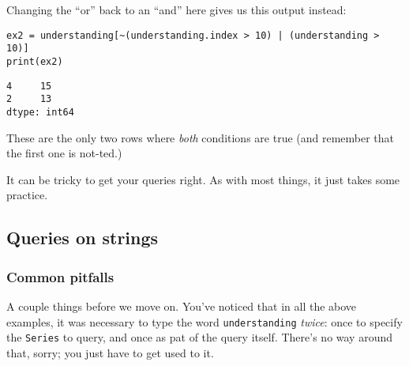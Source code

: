 Changing the ``or'' back to an ``and'' here gives us this output instead:

\begin{Verbatim}[fontsize=\small,samepage=true,frame=single,framesep=3mm]
ex2 = understanding[~(understanding.index > 10) | (understanding > 10)]
print(ex2)
\end{Verbatim}

\begin{Verbatim}[fontsize=\small,samepage=true,frame=leftline,framesep=5mm,framerule=1mm]
4     15
2     13
dtype: int64
\end{Verbatim}

These are the only two rows where \textit{both} conditions are true (and
remember that the first one is not-ted.)

It can be tricky to get your queries right. As with most things, it just takes
some practice.

\subsection{Queries on strings}


\subsubsection{Common pitfalls}

A couple things before we move on. You've noticed that in all the above
examples, it was necessary to type the word \texttt{understanding}
\textit{twice}: once to specify the \texttt{Series} to query, and once as pat
of the query itself. There's no way around that, sorry; you just have to get
used to it.

